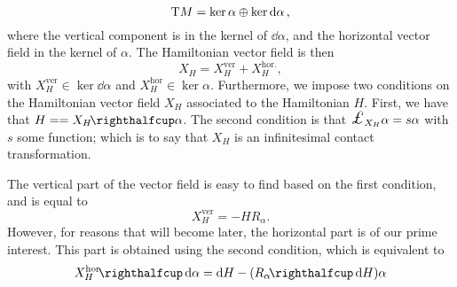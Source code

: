 $$ \mathrm{T}M = \ker \alpha \oplus \ker \dd{\alpha},$$
where the vertical component is in the kernel of $ \dd{\alpha}$, and the horizontal vector field in the kernel of $ \alpha $. The Hamiltonian vector field is then 
$$ X_H = X_H^\text{ver} + X_H^\text{hor.}, $$
with $X_H^\text{ver} \in \ker \dd{\alpha}$ and $X_H^\text{hor} \in \ker \alpha$.
Furthermore, we impose two conditions on the Hamiltonian vector field $X_H$ associated to the Hamiltonian $H$. First, we have that $ H = = \intpr{X_H}{\alpha} $. The second condition is that $\lied{X_H}\alpha = s \alpha $ with $s$ some function; which is to say that $X_H$ is an infinitesimal contact transformation. 

The vertical part of the vector field is easy to find based on the first condition, and is equal to
$$ X_H^\text{ver} = -H R_\alpha. $$
However, for reasons that will become later, the horizontal part is of our prime interest. This part is obtained using the second condition, which is equivalent to
\begin{equation}
    \intpr{X_H^\text{hor}}{\dd{\alpha}} = \dd{H} - (\intpr{R_\alpha}{\dd{H}}) \alpha 
    \label{eq:hor_vfield_condition}
\end{equation}

